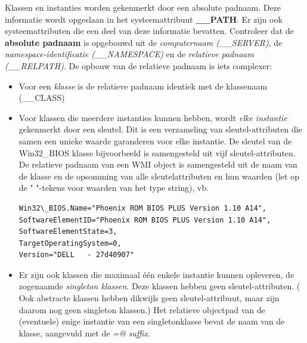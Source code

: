 \documentclass[11pt,a4paper]{report}
\begin{document}
Klassen en instanties worden gekenmerkt door een absolute padnaam. Deze informatie wordt opgeslaan in het systeemattribuut \textbf{\_\_PATH}. Er zijn ook systeemattributen die een deel van deze informatie bevatten. Controleer dat de \textbf{absolute padnaam} is opgebouwd uit de \textit{computernaam (\_\_SERVER)}, de \textit{namespace-identificatie (\_\_NAMESPACE)} en de \textit{relatieve padnaam (\_\_RELPATH)}. De opbouw van de relatieve padnaam is iets complexer:
\begin{itemize}
	\item Voor een \textit{klasse} is de relatieve padnaam identiek met de klassenaam (\_\_CLASS)
	\item Voor klassen die meerdere instanties kunnen hebben, wordt \textit{elke instantie} gekenmerkt door een sleutel. Dit is een verzameling van sleutel-attributen die samen een unieke waarde garanderen voor elke instantie. De sleutel van de Win32\_BIOS klasse bijvoorbeeld is samengesteld uit vijf sleutel-attributen. De relatieve padnaam van een WMI object is samengesteld uit de naam van de klasse en de opsomming van alle sleutelattributen en hun waarden (let op de " "-tekens voor waarden van het type string), vb.
	\begin{lstlisting}
Win32\_BIOS.Name="Phoenix ROM BIOS PLUS Version 1.10 A14",
SoftwareElementID="Phoenix ROM BIOS PLUS Version 1.10 A14",
SoftwareElementState=3,
TargetOperatingSystem=0,
Version="DELL   - 27d40907"
	\end{lstlisting}
	\item Er zijn ook klassen die maximaal één enkele instantie kunnen opleveren, de zogenaamde \textit{singleton klassen}. Deze klassen hebben geen sleutel-attributen. ( Ook abstracte klassen hebben dikwijls geen sleutel-attribuut, maar zijn daarom nog geen singleton klassen.) Het relatieve objectpad van de (eventuele) enige instantie van een singletonklasse bevat de naam van de klasse, aangevuld met de \textit{=@ suffix}.
\end{itemize}
\end{document}
